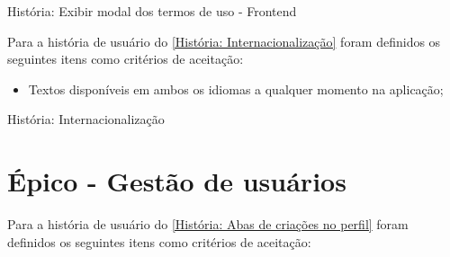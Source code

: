 \def\arraystretch{2}
\begin{quadro}[htb]
\centering
\ABNTEXfontereduzida
\caption[História: Exibir modal dos termos de uso - Frontend]{História: Exibir modal dos termos de uso - Frontend}
\label{História: Exibir modal dos termos de uso - Frontend}
\end{quadro}
\FloatBarrier 

Para a história de usuário do \autoref{História: Internacionalização} foram definidos os seguintes itens como critérios de aceitação:

\begin{itemize}
\item  Textos disponíveis em ambos os idiomas a qualquer momento na aplicação;
\end{itemize}

\def\arraystretch{2}
\begin{quadro}[htb]
\centering
\ABNTEXfontereduzida
\caption[História: Internacionalização]{História: Internacionalização}
\label{História: Internacionalização}
\end{quadro}
\FloatBarrier 

\section{Épico - Gestão de usuários}
\label{gestão_usuario}
Para a história de usuário do \autoref{História: Abas de criações no perfil} foram definidos os seguintes itens como critérios de aceitação:

